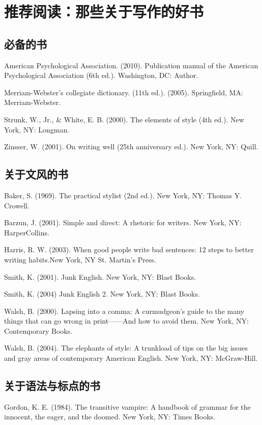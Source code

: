 \chapter{推荐阅读：那些关于写作的好书}
\section{必备的书}
American Psychological Association. (2010). Publication manual of the American Psychological Association (6th ed.). Washington, DC: Author.

Merriam-Webster's collegiate dictionary. (11th ed.). (2005). Springfield, MA: Merriam-Webster.

Strunk, W., Jr., \& White, E. B. (2000). The elements of style (4th ed.). New York, NY: Longman.

Zinsser, W. (2001). On writing well (25th anniversary ed.). New York, NY: Quill.



\section{关于文风的书}
Baker, S. (1969). The practical stylist (2nd ed.). New York, NY: Thomas Y. Crowell.

Barzun, J. (2001). Simple and direct: A rhetoric for writers. New York, NY: HarperCollins.

Harris, R. W. (2003). When good people write bad sentences: 12 steps to better writing habits.New York, NY St. Martin's Press.

Smith, K. (2001). Junk English. New York, NY: Blast Books.

Smith, K. (2004) Junk English 2. New York, NY: Blast Books.

Walsh, B. (2000). Lapsing into a comma: A curmudgeon's guide to the many things that can go wrong in print——And how to avoid them. New York, NY: Contemporary Books.

Walsh, B. (2004). The elephants of style: A trunkload of tips on the big issues and gray areas of contemporary American English. New York, NY: McGraw-Hill.




\section{关于语法与标点的书}
Gordon, K. E. (1984). The transitive vampire: A handbook of grammar for the innocent, the eager, and the doomed. New York, NY: Times Books.

